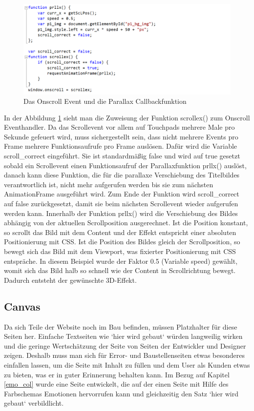 \begin{figure} [h]
\includegraphics[width=\textwidth]{./img/js_scrollex.png}
\caption{Das Onscroll Event und die Parallax Callbackfunktion}
\label{js_scrollex}
\end{figure}
In der Abbildung \ref{js_scrollex} sieht man die Zuweisung der Funktion scrollex() zum Onscroll Eventhandler. Da das Scrollevent vor allem auf Touchpads mehrere Male pro Sekunde gefeuert wird, muss sichergestellt sein, dass nicht mehrere Events pro Frame mehrere Funktionsaufrufe pro Frame auslösen. Dafür wird die Variable scroll\_correct eingeführt. Sie ist standardmäßig false und wird auf true gesetzt sobald ein Scrollevent einen Funktionsaufruf der Parallaxfunktion prllx() auslöst, danach kann diese Funktion, die für die parallaxe Verschiebung des Titelbildes verantwortlich ist, nicht mehr aufgerufen werden bis sie zum nächsten AnimationFrame ausgeführt wird. Zum Ende der Funktion wird scroll\_correct auf false zurückgesetzt, damit sie beim nächsten Scrollevent wieder aufgerufen werden kann. Innerhalb der Funktion prllx() wird die Verschiebung des Bildes abhängig von der aktuellen Scrollposition ausgerechnet. Ist die Position konstant, so scrollt das Bild mit dem Content und der Effekt entspricht einer absoluten Positionierung mit CSS. Ist die Position des Bildes gleich der Scrollposition, so bewegt sich das Bild mit dem Viewport, was fixierter Positionierung mit CSS entspräche. In diesem Beispiel wurde der Faktor 0.5 (Variable speed) gewählt, womit sich das Bild halb so schnell wie der Content in Scrollrichtung bewegt. Dadurch entsteht der gewünschte 3D-Effekt.




\subsection{Canvas}

Da sich Teile der Website noch im Bau befinden, müssen Platzhalter für diese Seiten her. Einfache Textseiten wie `hier wird gebaut` würden langweilig wirken und die geringe Wertschätzung der Seite von Seiten der Entwickler und Designer zeigen. Deshalb muss man sich für Error- und Baustellenseiten etwas besonderes einfallen lassen, um die Seite mit Inhalt zu füllen und dem User als Kunden etwas zu bieten, was er in guter Erinnerung behalten kann. Im Bezug auf Kapitel \ref{emo_col} wurde eine Seite entwickelt, die auf der einen Seite mit Hilfe des Farbschemas Emotionen hervorrufen kann und gleichzeitig den Satz `hier wird gebaut` verbildlicht.

